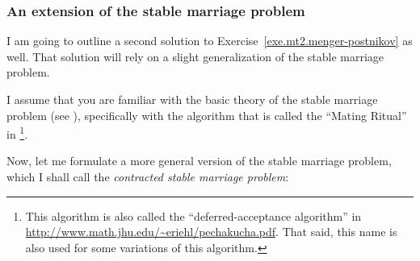 \documentclass[numbers=enddot,12pt,final,onecolumn,notitlepage]{scrartcl}%
\theoremstyle{definition}
\begin{document}
\subsubsection{An extension of the stable marriage problem}

I am going to outline a second solution to
Exercise~\ref{exe.mt2.menger-postnikov} as well.
That solution will rely on a slight generalization of the stable
marriage problem.

I assume that you are familiar with the basic theory of the
stable marriage problem (see \cite[Section 6.4]{LeLeMe16}),
specifically with the algorithm that is called the
``Mating Ritual'' in \cite[Section 6.4]{LeLeMe16}\footnote{This
algorithm is also called the ``deferred-acceptance algorithm''
in \url{http://www.math.jhu.edu/~eriehl/pechakucha.pdf}.
That said, this name is also used for some variations of this
algorithm.}.

Now, let me formulate a more general version of the stable
marriage problem, which I shall call the \textit{contracted
stable marriage problem}:
\end{document}
